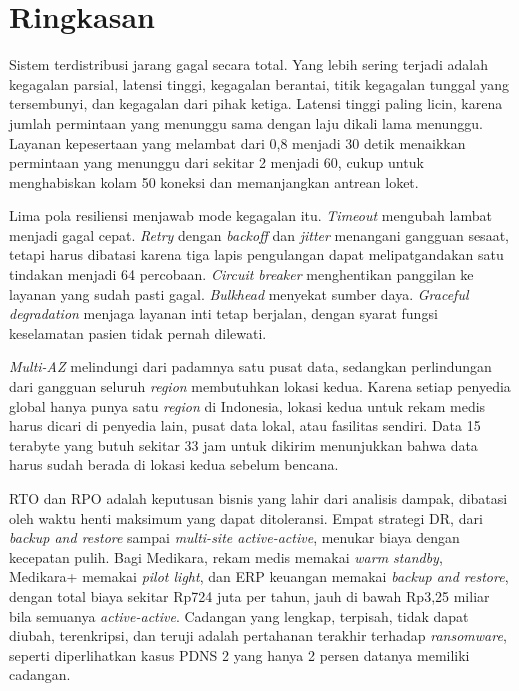 \section{Ringkasan}

Sistem terdistribusi jarang gagal secara total. Yang lebih sering terjadi adalah kegagalan parsial,
latensi tinggi, kegagalan berantai, titik kegagalan tunggal yang tersembunyi, dan kegagalan dari
pihak ketiga. Latensi tinggi paling licin, karena jumlah permintaan yang menunggu sama dengan laju
dikali lama menunggu. Layanan kepesertaan yang melambat dari 0,8 menjadi 30 detik menaikkan
permintaan yang menunggu dari sekitar 2 menjadi 60, cukup untuk menghabiskan kolam 50 koneksi dan
memanjangkan antrean loket.

Lima pola resiliensi menjawab mode kegagalan itu. \textit{Timeout} mengubah lambat menjadi gagal
cepat. \textit{Retry} dengan \textit{backoff} dan \textit{jitter} menangani gangguan sesaat, tetapi
harus dibatasi karena tiga lapis pengulangan dapat melipatgandakan satu tindakan menjadi 64
percobaan. \textit{Circuit breaker} menghentikan panggilan ke layanan yang sudah pasti gagal.
\textit{Bulkhead} menyekat sumber daya. \textit{Graceful degradation} menjaga layanan inti tetap
berjalan, dengan syarat fungsi keselamatan pasien tidak pernah dilewati.

\textit{Multi-AZ} melindungi dari padamnya satu pusat data, sedangkan perlindungan dari gangguan
seluruh \textit{region} membutuhkan lokasi kedua. Karena setiap penyedia global hanya punya satu
\textit{region} di Indonesia, lokasi kedua untuk rekam medis harus dicari di penyedia lain, pusat
data lokal, atau fasilitas sendiri. Data 15 terabyte yang butuh sekitar 33 jam untuk dikirim
menunjukkan bahwa data harus sudah berada di lokasi kedua sebelum bencana.

RTO dan RPO adalah keputusan bisnis yang lahir dari analisis dampak, dibatasi oleh waktu henti
maksimum yang dapat ditoleransi. Empat strategi DR, dari \textit{backup and restore} sampai
\textit{multi-site active-active}, menukar biaya dengan kecepatan pulih. Bagi Medikara, rekam medis
memakai \textit{warm standby}, Medikara+ memakai \textit{pilot light}, dan ERP keuangan memakai
\textit{backup and restore}, dengan total biaya sekitar Rp724 juta per tahun, jauh di bawah Rp3,25
miliar bila semuanya \textit{active-active}. Cadangan yang lengkap, terpisah, tidak dapat diubah,
terenkripsi, dan teruji adalah pertahanan terakhir terhadap \textit{ransomware}, seperti
diperlihatkan kasus PDNS 2 yang hanya 2 persen datanya memiliki cadangan.

